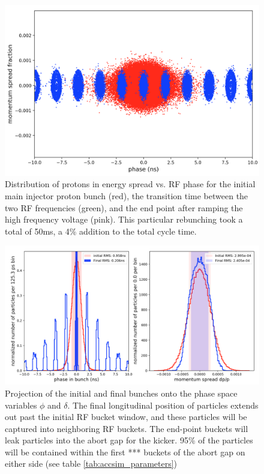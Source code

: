 \begin{figure}[h!]
	\begin{center}
        \includegraphics[width=0.60\linewidth]{Figures/bunch_distributions.png}
	\end{center}
	\caption{Distribution of protons in energy spread vs. RF phase
          for the initial main injector proton bunch (red), the
          transition time between the two RF frequencies (green), and
          the end point after ramping the high frequency voltage
          (pink). This particular rebunching took a total of 50ms, a
          4\% addition to the total cycle time.}
		\label{fig:bunch_distributions}
\end{figure}

\begin{figure}[h!]
	\begin{center}
        \includegraphics[width=0.60\linewidth]{Figures/bunch_projections.png}
	\end{center}
	\caption{Projection of the initial and final bunches onto the phase space variables $\phi$ and $\delta$. 
	The final longitudinal position of particles extends out past the initial RF bucket window, and these
	particles will be captured into neighboring RF buckets. The end-point buckets will leak particles into 
	the abort gap for the kicker. 95\% of the particles will be contained within the first *** buckets of the abort gap on either side (see table \ref{tab:accsim_parameters})}
		\label{fig:bunch_projections}
\end{figure}

